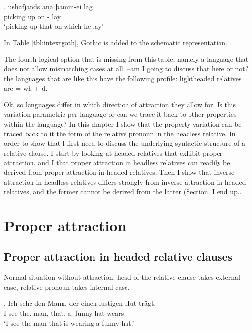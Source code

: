 \exg. ushafjands ana þamm-ei lag\\
{picking up} on - lay\\
`picking up that on which he lay' \hfill \citep[339,434]{harbert1978}\label{ex:invattgot}

In Table \ref{tbl:intextgoth}, Gothic is added to the schematic representation.



The fourth logical option that is missing from this table, namely a language that does not allow mismatching cases at all. --am I going to discuss that here or not? the languages that are like this have the following profile: lightheaded relatives are = wh + d.--


Ok, so languages differ in which direction of attraction they allow for. Is this variation parametric per language or can we trace it back to other properties within the language? In this chapter I show that the property variation can be traced back to it the form of the relative pronoun in the headless relative. In order to show that I first need to discuss the underlying syntactic structure of a relative clause. I start by looking at headed relatives that exhibit proper attraction, and I that proper attraction in headless relatives can readily be derived from proper attraction in headed relatives. Then I show that inverse attraction in headless relatives differs strongly from inverse attraction in headed relatives, and the former cannot be derived from the latter (Section. I end up..


\section{Proper attraction}\label{sec:propatt}

\subsection{Proper attraction in headed relative clauses}\label{sec:attheaded}

Normal situation without attraction: head of the relative clause takes external case, relative pronoun takes internal case.

\exg. Ich sehe den Mann, der einen lustigen Hut trägt.\\
I see the. man, that. a. funny hat wears\\
`I see the man that is wearing a funny hat.'


